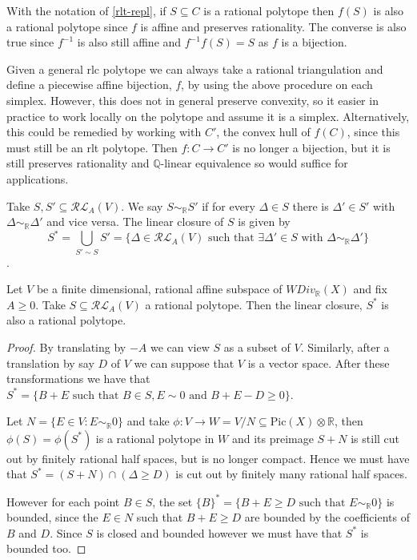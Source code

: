 \begin{remark}
	With the notation of \autoref{rlt-repl}, if $S \subseteq C$ is a rational polytope then $f(S)$ is also a rational polytope since $f$ is affine and preserves rationality. The converse is also true since $f^{-1}$ is also still affine and $f^{-1}f(S)=S$ as $f$ is a bijection.  
\end{remark}


	Given a general rlc polytope we can always take a rational triangulation and define a piecewise affine bijection, $f$, by using the above procedure on each simplex. However, this does not in general preserve convexity, so it easier in practice to work locally on the polytope and assume it is a simplex. Alternatively, this could be remedied by working with $C'$, the convex hull of $f(C)$, since this must still be an rlt polytope. Then $f\colon C \to C'$ is no longer a bijection, but it is still preserves rationality and $\mathbb{Q}$-linear equivalence so would suffice for applications. 

	
	\begin{definition}
		Take $S, S' \subseteq \mathcal{RL}_{A}(V)$. We say $S \sim_{\mathbb{R}} S'$ if for every $\Delta \in S$ there is $\Delta' \in S'$ with $\Delta \sim_{\mathbb{R}} \Delta'$ and vice versa. The linear closure of $S$ is given by $$S^{*}=\bigcup_{S' \sim S}S'= \{\Delta \in \mathcal{RL}_{A}(V) \text{ such that } \exists \Delta' \in S \text{ with }\Delta \sim_{\mathbb{R}} \Delta'\}$$.
	\end{definition}
	
	

	\begin{lemma}
		Let $V$ be a finite dimensional, rational affine subspace of $WDiv_{\mathbb{R}}(X)$ and fix $A \geq 0$. Take $S \subseteq \mathcal{RL}_{A}(V)$ a rational polytope. Then the linear closure, $S^{*}$ is also a rational polytope. 
	\end{lemma}
	
	\begin{proof}
		By translating by $-A$ we can view $S$ as a subset of $V$. Similarly, after a translation by say $D$ of $V$ we can suppose that $V$ is a vector space. After these transformations we have that $S^{*}=\{B+E \text{ such that } B\in S, E \sim 0 \text{ and } B+E -D \geq 0\}$.
		
		
		Let $N=\{E \in V: E \sim_{\mathbb{R}} 0\}$ and take $\phi:V \to W=V/N \subseteq \text{Pic}(X)\otimes \mathbb{R}$, then $\phi(S)=\phi(S^{*})$ is a rational polytope in $W$ and its preimage $S+N$ is still cut out by finitely rational half spaces, but is no longer compact. Hence we must have that $S^{*}=(S+N)\cap({\Delta \geq D})$ is cut out by finitely many rational half spaces. 
		
		However for each point $B \in S$, the set $\{B\}^{*}=\{B+E\geq D \text{ such that } E \sim_{\mathbb{R}} 0\}$ is bounded, since the $E\in N$ such that $B+E \geq D$ are bounded by the coefficients of $B$ and $D$. Since $S$ is closed and bounded however we must have that $S^{*}$ is bounded too.
	\end{proof}
	

